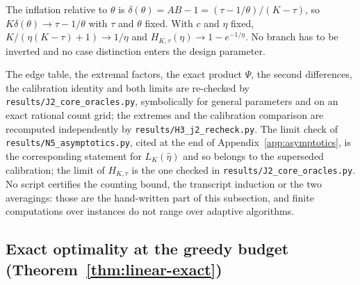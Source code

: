 The inflation relative to $\theta$ is $\delta(\theta)=AB-1=(\tau-1/\theta)/
(K-\tau)$, so $K\delta(\theta)\to\tau-1/\theta$ with $\tau$ and $\theta$
fixed.  With $c$ and $\eta$ fixed, $K/(\eta(K-\tau)+1)\to1/\eta$ and
$H_{K,\tau}(\eta)\to1-e^{-1/\eta}$.  No branch has to be inverted and no case
distinction enters the design parameter.

The edge table, the extremal factors, the exact product $\Psi$, the second
differences, the calibration identity and both limits are re-checked by
\texttt{results/J2\_core\_oracles.py}, symbolically for general parameters and
on an exact rational count grid; the extremes and the calibration comparison
are recomputed independently by \texttt{results/H3\_j2\_recheck.py}.  The
limit check of \texttt{results/N5\_asymptotics.py}, cited at the end of
Appendix~\ref{app:asymptotics}, is the corresponding statement for
$L_K(\hat\eta)$ and so belongs to the superseded calibration; the limit of
$H_{K,\tau}$ is the one checked in \texttt{results/J2\_core\_oracles.py}.  No
script certifies the counting bound, the transcript induction or the two
averagings: those are the hand-written part of this subsection, and finite
computations over instances do not range over adaptive algorithms.

\subsection{Exact optimality at the greedy budget
  (Theorem~\ref{thm:linear-exact})}
\label{app:greedybudget}

